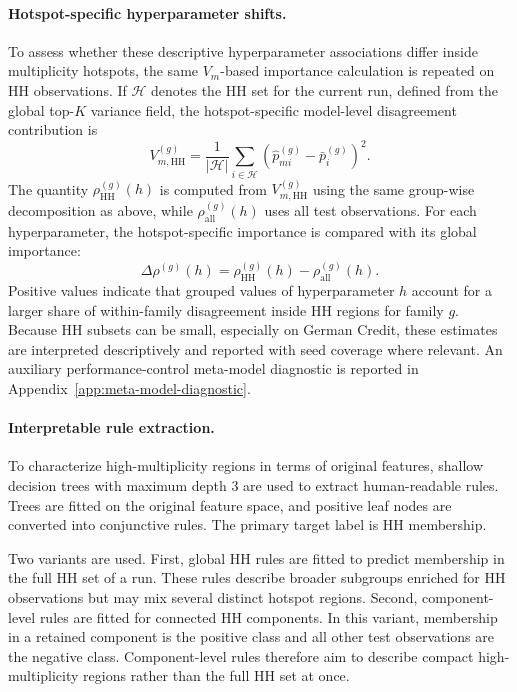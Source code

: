 \paragraph{Hotspot-specific hyperparameter shifts.}
To assess whether these descriptive hyperparameter associations differ inside multiplicity
hotspots, the same \(V_m\)-based importance calculation is repeated on HH observations.
If \(\mathcal{H}\) denotes the HH set for the current run, defined from the global
top-\(K\) variance field, the hotspot-specific model-level disagreement contribution is
\[
V^{(g)}_{m,\mathrm{HH}}
=
\frac{1}{|\mathcal{H}|}
\sum_{i\in\mathcal{H}}
\left(\hat{p}^{(g)}_{mi}-\bar{p}^{(g)}_i\right)^2 .
\]
The quantity \(\rho^{(g)}_{\mathrm{HH}}(h)\) is computed from
\(V^{(g)}_{m,\mathrm{HH}}\) using the same group-wise decomposition as above, while
\(\rho^{(g)}_{\mathrm{all}}(h)\) uses all test observations. For each hyperparameter, the
hotspot-specific importance is compared with its global importance:
\[
\Delta\rho^{(g)}(h)
=
\rho^{(g)}_{\mathrm{HH}}(h)
-
\rho^{(g)}_{\mathrm{all}}(h).
\]
Positive values indicate that grouped values of hyperparameter \(h\) account for a larger
share of within-family disagreement inside HH regions for family \(g\). Because HH subsets
can be small, especially on German Credit, these estimates are interpreted descriptively
and reported with seed coverage where relevant. An auxiliary performance-control
meta-model diagnostic is reported in Appendix~\ref{app:meta-model-diagnostic}.

\paragraph{Interpretable rule extraction.}
To characterize high-multiplicity regions in terms of original features, shallow decision
trees with maximum depth 3 are used to extract human-readable rules. Trees are fitted on
the original feature space, and positive leaf nodes are converted into conjunctive rules.
The primary target label is HH membership.

Two variants are used. First, global HH rules are fitted to predict membership in the full
HH set of a run. These rules describe broader subgroups enriched for HH observations but
may mix several distinct hotspot regions. Second, component-level rules are fitted for
connected HH components. In this variant, membership in a retained component is the
positive class and all other test observations are the negative class. Component-level rules
therefore aim to describe compact high-multiplicity regions rather than the full HH set at
once.

